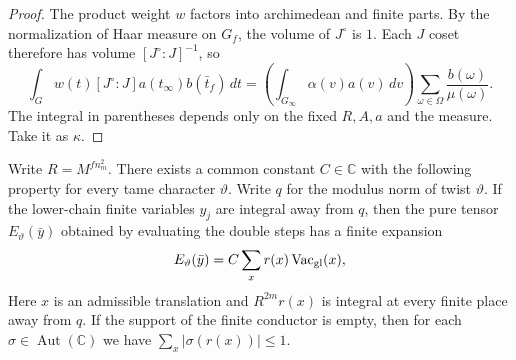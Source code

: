 \begin{proof}
The product weight $w$ factors into archimedean and finite parts. By the normalization of Haar measure on $G_f$, the volume of $J^\circ$ is $1$. Each $J$ coset therefore has volume $[J^\circ:J]^{-1}$, so
\[
 \int_G w(t)[J^\circ:J]a(t_\infty)b(\bar t_f)\,dt
   =\left(\int_{G_\infty}\alpha(v)a(v)\,dv\right)
      \sum_{\omega\in\Omega}\frac{b(\omega)}{\mu(\omega)} .
\]
The integral in parentheses depends only on the fixed $R,A,a$ and the measure. Take it as $\kappa$.
\end{proof}

\begin{lemma}
\label{lem:a-seesaw-vacuum-expansion}
\emitthmsource
Write $R=M^{f n_m^2}$. There exists a common constant $C\in\mathbb C$ with the following property for every tame character $\vartheta$. Write $q$ for the modulus norm of twist $\vartheta$. If the lower-chain finite variables $y_j$ are integral away from $q$, then the pure tensor $E_\vartheta(\bar y)$ obtained by evaluating the double steps has a finite expansion
\[
 E_\vartheta(\bar y)
  =C\sum_x r(x)\operatorname{Vac}_{\rm gl}(x),
\]
Here $x$ is an admissible translation and $R^{2m}r(x)$ is integral at every finite place away from $q$. If the support of the finite conductor is empty, then for each $\sigma\in\operatorname{Aut}(\mathbb C)$ we have $\sum_x|\sigma(r(x))|\le1$.
\end{lemma}
